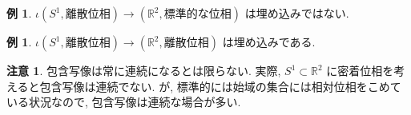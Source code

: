 \documentclass[10pt, fleqn, label-section=none]{bxjsarticle}
\theoremstyle{definition}
\newtheorem{ex}[dfn]{例}
\newtheorem{remark}[dfn]{注意}
\begin{document}
\begin{ex}
$\iota (S^1, \text{離散位相}) \rightarrow (\mathbb R^2, \text{標準的な位相})$ は埋め込みではない. 
\end{ex}

\begin{ex}
$\iota (S^1, \text{離散位相}) \rightarrow (\mathbb R^2, \text{離散位相})$ は埋め込みである. 
\end{ex}


\begin{remark}
包含写像は常に連続になるとは限らない. 実際, $S^1 \subset \mathbb R^2$ に密着位相を考えると包含写像は連続でない. が, 標準的には始域の集合には相対位相をこめている状況なので, 包含写像は連続な場合が多い. 
\end{remark}
\end{document}
